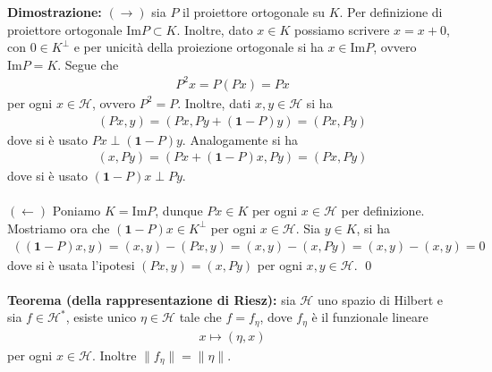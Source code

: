 \documentclass{article}
\numberwithin{equation}{subsection}
\begin{document}
\textbf{Dimostrazione:} $(\rightarrow)$ sia $P$ il proiettore ortogonale su $K$. Per definizione di proiettore ortogonale $\mathrm{Im}P \subset K$. Inoltre, dato $x \in K$ possiamo scrivere $x = x + 0$, con $0 \in K^\perp$ e per unicità della proiezione ortogonale si ha $x \in \mathrm{Im}P$, ovvero $\mathrm{Im}P = K$. Segue che
\begin{align*}
    P^2x = P(Px) = Px 
\end{align*}
per ogni $x \in \mathcal{H}$, ovvero $P^2 = P$. Inoltre, dati $x, y \in \mathcal{H}$ si ha 
\begin{align*}
    (Px, y) = (Px, Py + (\mathbf{1} - P)y) = (Px, Py) 
\end{align*}
dove si è usato $Px \perp (\mathbf{1} - P)y$. Analogamente si ha 
\begin{align*}
    (x, Py) = (Px + (\mathbf{1} - P)x, Py) = (Px, Py) 
\end{align*}
dove si è usato $(\mathbf{1} - P)x \perp Py$. \\ \\
$(\leftarrow)$ Poniamo $K = \mathrm{Im}P$, dunque $Px \in K$ per ogni $x \in \mathcal{H}$ per definizione. Mostriamo ora che $(\mathbf{1} - P)x \in K^\perp$ per ogni $x \in\mathcal{H}$. Sia $y \in K$, si ha
\begin{align*}
    ((\mathbf{1} - P)x, y) = (x, y) - (Px, y) = (x, y) - (x, Py) = (x, y) - (x, y) = 0 
\end{align*}
dove si è usata l'ipotesi $(Px, y) = (x, Py)$ per ogni $x, y \in \mathcal{H}$. \qed \\ \\
\textbf{Teorema (della rappresentazione di Riesz):} sia $\mathcal{H}$ uno spazio di Hilbert e sia $f \in \mathcal{H}^*$, esiste unico $\eta \in \mathcal{H}$ tale che $f = f_\eta$, dove $f_\eta$ è il funzionale lineare 
\begin{align*}
    x \mapsto (\eta, x) 
\end{align*}
per ogni $x \in \mathcal{H}$. Inoltre $\|f_\eta\| = \|\eta\|$. \\
\end{document}
